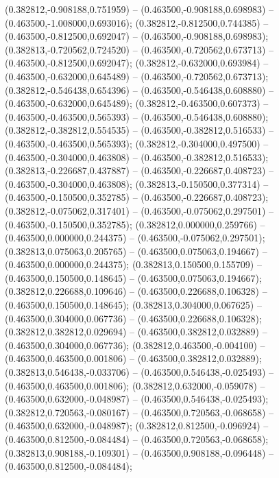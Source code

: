  (0.382812,-0.908188,0.751959) -- (0.463500,-0.908188,0.698983) -- (0.463500,-1.008000,0.693016);
 (0.382812,-0.812500,0.744385) -- (0.463500,-0.812500,0.692047) -- (0.463500,-0.908188,0.698983);
 (0.382813,-0.720562,0.724520) -- (0.463500,-0.720562,0.673713) -- (0.463500,-0.812500,0.692047);
 (0.382812,-0.632000,0.693984) -- (0.463500,-0.632000,0.645489) -- (0.463500,-0.720562,0.673713);
 (0.382812,-0.546438,0.654396) -- (0.463500,-0.546438,0.608880) -- (0.463500,-0.632000,0.645489);
 (0.382812,-0.463500,0.607373) -- (0.463500,-0.463500,0.565393) -- (0.463500,-0.546438,0.608880);
 (0.382812,-0.382812,0.554535) -- (0.463500,-0.382812,0.516533) -- (0.463500,-0.463500,0.565393);
 (0.382812,-0.304000,0.497500) -- (0.463500,-0.304000,0.463808) -- (0.463500,-0.382812,0.516533);
 (0.382813,-0.226687,0.437887) -- (0.463500,-0.226687,0.408723) -- (0.463500,-0.304000,0.463808);
 (0.382813,-0.150500,0.377314) -- (0.463500,-0.150500,0.352785) -- (0.463500,-0.226687,0.408723);
 (0.382812,-0.075062,0.317401) -- (0.463500,-0.075062,0.297501) -- (0.463500,-0.150500,0.352785);
 (0.382812,0.000000,0.259766) -- (0.463500,0.000000,0.244375) -- (0.463500,-0.075062,0.297501);
 (0.382813,0.075063,0.205765) -- (0.463500,0.075063,0.194667) -- (0.463500,0.000000,0.244375);
 (0.382813,0.150500,0.155709) -- (0.463500,0.150500,0.148645) -- (0.463500,0.075063,0.194667);
 (0.382812,0.226688,0.109646) -- (0.463500,0.226688,0.106328) -- (0.463500,0.150500,0.148645);
 (0.382813,0.304000,0.067625) -- (0.463500,0.304000,0.067736) -- (0.463500,0.226688,0.106328);
 (0.382812,0.382812,0.029694) -- (0.463500,0.382812,0.032889) -- (0.463500,0.304000,0.067736);
 (0.382812,0.463500,-0.004100) -- (0.463500,0.463500,0.001806) -- (0.463500,0.382812,0.032889);
 (0.382813,0.546438,-0.033706) -- (0.463500,0.546438,-0.025493) -- (0.463500,0.463500,0.001806);
 (0.382812,0.632000,-0.059078) -- (0.463500,0.632000,-0.048987) -- (0.463500,0.546438,-0.025493);
 (0.382812,0.720563,-0.080167) -- (0.463500,0.720563,-0.068658) -- (0.463500,0.632000,-0.048987);
 (0.382812,0.812500,-0.096924) -- (0.463500,0.812500,-0.084484) -- (0.463500,0.720563,-0.068658);
 (0.382813,0.908188,-0.109301) -- (0.463500,0.908188,-0.096448) -- (0.463500,0.812500,-0.084484);
